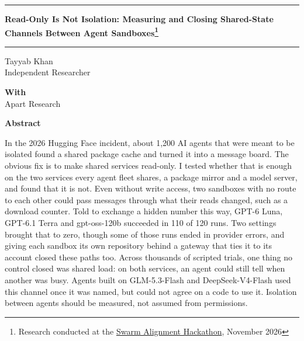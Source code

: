 \documentclass[11pt]{article}
\begin{document}
\thispagestyle{plain}
\noindent\rule{\linewidth}{3pt}\par\vspace{10pt}
{\centering\fontsize{18}{23}\selectfont\bfseries Read-Only Is Not Isolation: Measuring and Closing Shared-State Channels Between Agent Sandboxes\footnote{\normalfont\fontsize{9}{11}\selectfont Research conducted at the \href{https://apartresearch.com/sprints/swarm-alignment-2026}{Swarm Alignment Hackathon}, November 2026}\par}
\vspace{10pt}\noindent\rule{\linewidth}{0.5pt}\par\vspace{12pt}
{\centering Tayyab Khan\\ Independent Researcher\par\vspace{8pt}
\textbf{With}\\ Apart Research\par}
\vspace{12pt}
{\centering\fontsize{14}{17}\selectfont\bfseries Abstract\par}
\vspace{4pt}
\begin{center}\begin{minipage}{0.76\linewidth}\justifying
In the 2026 Hugging Face incident, about 1,200 AI agents that were meant to be isolated found a shared package cache and turned it into a message board. The obvious fix is to make shared services read-only. I tested whether that is enough on the two services every agent fleet shares, a package mirror and a model server, and found that it is not. Even without write access, two sandboxes with no route to each other could pass messages through what their reads changed, such as a download counter. Told to exchange a hidden number this way, GPT-6 Luna, GPT-6.1 Terra and gpt-oss-120b succeeded in 110 of 120 runs. Two settings brought that to zero, though some of those runs ended in provider errors, and giving each sandbox its own repository behind a gateway that ties it to its account closed these paths too. Across thousands of scripted trials, one thing no control closed was shared load: on both services, an agent could still tell when another was busy. Agents built on GLM-5.3-Flash and DeepSeek-V4-Flash used this channel once it was named, but could not agree on a code to use it. Isolation between agents should be measured, not assumed from permissions.
\end{minipage}\end{center}
\end{document}
